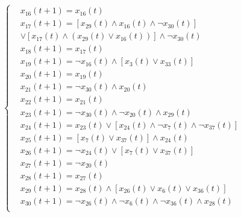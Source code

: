 \begin{small}
	\begin{equation}
		\left\{
		\begin{aligned}
			& x_{16} (t+1) = x_{16}(t) \\
			& x_{17} (t+1) = [x_{29}(t) \wedge x_{16}(t)  \wedge  \neg x_{30}(t)] \\
			&\vee [x_{17}(t) \wedge(x_{29}(t) \vee x_{16}(t))] \wedge \neg x_{30}(t) \\
			& x_{18} (t+1) = x_{17}(t) \\
			& x_{19} (t+1)=  \neg x_{16}(t)  \wedge [x_{3}(t)   \vee  x_{33}(t)]  \\
			& x_{20} (t+1)= x_{19}(t)  \\
			& x_{21} (t+1)=  \neg x_{30}(t)  \wedge x_{20}(t)  \\
			& x_{22} (t+1)= x_{21}(t)  \\
			& x_{23} (t+1)=  \neg x_{30}(t) \wedge  \neg x_{20}(t)  \wedge x_{29}(t)  \\
			& x_{24} (t+1)= x_{23}(t)  \vee  [x_{24}(t)  \wedge  \neg x_{7}(t)  \wedge  \neg x_{37}(t)] \\
			& x_{25} (t+1)= [x_7(t) \vee  x_{37}(t)]  \wedge x_{24}(t)  \\
			& x_{26} (t+1)=  \neg x_{24}(t)   \vee  [x_7(t)   \vee  x_{37}(t)]  \\
			& x_{27} (t+1)=  \neg x_{20}(t)  \\
			& x_{28} (t+1)=  x_{27}(t)  \\
			& x_{29} (t+1)=  x_{28}(t)  \wedge [x_{26}(t)  \vee  x_{6}(t)  \vee x_{36}(t)] \\
			& x_{30} (t+1)=  \neg x_{26}(t)  \wedge  \neg x_{6}(t)  \wedge  \neg x_{36}(t)  \wedge x_{28}(t) \\
		\end{aligned}
		\label{SegmentBF}
		\right.
	\end{equation}
\end{small}





\clearpage